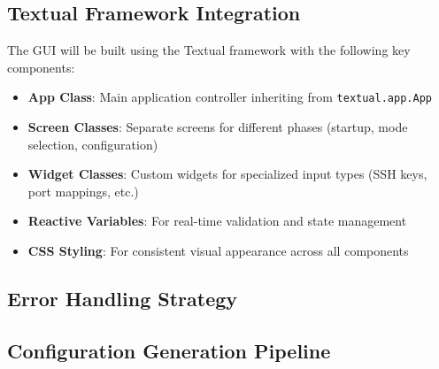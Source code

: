 \documentclass[11pt,a4paper]{article}
\begin{document}
\subsection{Textual Framework Integration}

The GUI will be built using the Textual framework with the following key components:

\begin{itemize}
    \item \textbf{App Class}: Main application controller inheriting from \texttt{textual.app.App}
    \item \textbf{Screen Classes}: Separate screens for different phases (startup, mode selection, configuration)
    \item \textbf{Widget Classes}: Custom widgets for specialized input types (SSH keys, port mappings, etc.)
    \item \textbf{Reactive Variables}: For real-time validation and state management
    \item \textbf{CSS Styling}: For consistent visual appearance across all components
\end{itemize}

\subsection{Error Handling Strategy}


\subsection{Configuration Generation Pipeline}
\end{document}

